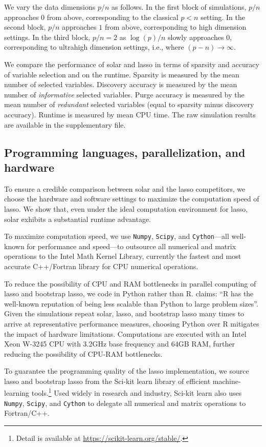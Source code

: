 \documentclass[11pt,review,authoryear]{elsarticle}
\begin{document}
We vary the data dimensions $p/n$ as follows. In the first block of simulations, $p/n$ approaches $0$ from above, corresponding to the classical $p<n$ setting. In the second block, $p/n$ approaches $1$ from above, corresponding to high dimension settings. In the third block, $p/n=2$ as $\log(p)/n$ slowly approaches $0$, corresponding to ultrahigh dimension settings, i.e., where $(p-n)\rightarrow\infty$.

We compare the performance of solar and lasso in terms of sparsity and accuracy of variable selection and on the runtime. Sparsity is measured by the mean number of selected variables. Discovery accuracy is measured by the mean number of \emph{informative} selected variables. Purge accuracy is measured by the mean number of \emph{redundant} selected variables (equal to sparsity minus discovery accuracy). Runtime is measured by mean CPU time.  The raw simulation results are available in the supplementary file.

\subsection{Programming languages, parallelization, and hardware}

To ensure a credible comparison between solar and the lasso competitors, we choose the hardware and software settings to maximize the computation speed of lasso. We show that, even under the ideal computation environment for lasso, solar exhibits a substantial runtime advantage.

To maximize computation speed, we use \texttt{Numpy}, \texttt{Scipy}, and \texttt{Cython}---all well-known for performance and speed---to outsource all numerical and matrix operations to the Intel Math Kernel Library, currently the fastest and most accurate C++/Fortran library for CPU numerical operations.

To reduce the possibility of CPU and RAM bottlenecks in parallel computing of lasso and bootstrap lasso, we code in Python rather than R. \citet{donoho201750} claims: ``R has the well-known reputation of being less scalable than Python to large problem sizes''. Given the simulations repeat solar, lasso, and bootstrap lasso many times to arrive at representative performance measures, choosing Python over R mitigates the impact of hardware limitations. Computations are executed with an Intel Xeon W-3245 CPU with 3.2GHz base frequency and 64GB RAM, further reducing the possibility of CPU-RAM bottlenecks.

To guarantee the programming quality of the lasso implementation, we source lasso and bootstrap lasso from the Sci-kit learn library \citep{scikit-learn} of efficient machine-learning tools.\footnote{Detail is available at \url{https://scikit-learn.org/stable/}.} Used widely in research and industry, Sci-kit learn also uses \texttt{Numpy}, \texttt{Scipy}, and \texttt{Cython} to delegate all numerical and matrix operations to Fortran/C++.
\end{document}

